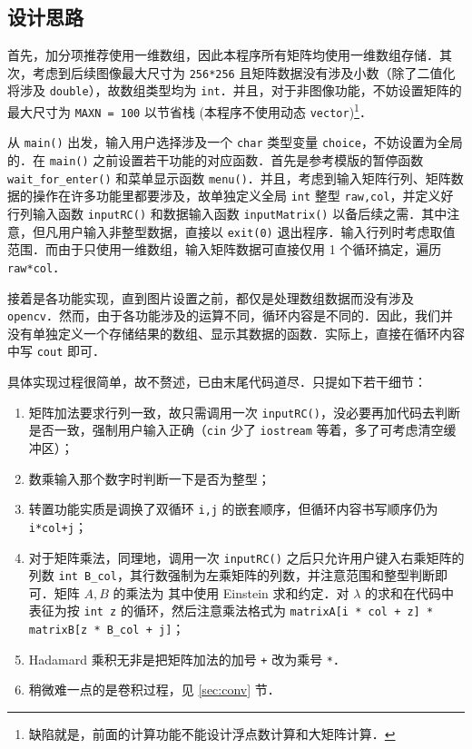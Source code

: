 \documentclass[12pt,a4paper,twoside]{ctexart}
\numberwithin{figure}{section}
\numberwithin{equation}{section}
\begin{document}
\subsection{设计思路}

首先，加分项推荐使用一维数组，因此本程序所有矩阵均使用一维数组存储．其次，考虑到后续图像最大尺寸为 \verb|256*256| 且矩阵数据没有涉及小数（除了二值化将涉及 \verb|double|），故数组类型均为 \verb|int|．并且，对于非图像功能，不妨设置矩阵的最大尺寸为 \verb|MAXN = 100| 以节省栈 (本程序不使用动态 \verb|vector|)\footnote{缺陷就是，前面的计算功能不能设计浮点数计算和大矩阵计算．}．

从 \verb|main()| 出发，输入用户选择涉及一个 \verb|char| 类型变量 \verb|choice|，不妨设置为全局的．在 \verb|main()| 之前设置若干功能的对应函数．首先是参考模版的暂停函数 \verb|wait_for_enter()| 和菜单显示函数 \verb|menu()|．并且，考虑到输入矩阵行列、矩阵数据的操作在许多功能里都要涉及，故单独定义全局 \verb|int| 整型 \verb|raw,col|，并定义好行列输入函数 \verb|inputRC()| 和数据输入函数 \verb|inputMatrix()| 以备后续之需．其中注意，但凡用户输入非整型数据，直接以 \verb|exit(0)| 退出程序．输入行列时考虑取值范围．而由于只使用一维数组，输入矩阵数据可直接仅用 1 个循环搞定，遍历 \verb|raw*col|．

接着是各功能实现，直到图片设置之前，都仅是处理数组数据而没有涉及 \verb|opencv|．然而，由于各功能涉及的运算不同，循环内容是不同的．因此，我们并没有单独定义一个存储结果的数组、显示其数据的函数．实际上，直接在循环内容中写 \verb|cout| 即可．

具体实现过程很简单，故不赘述，已由末尾代码道尽．只提如下若干细节：
\begin{enumerate}
    \item 矩阵加法要求行列一致，故只需调用一次 \verb|inputRC()|，没必要再加代码去判断是否一致，强制用户输入正确（\verb|cin| 少了 \verb|iostream| 等着，多了可考虑清空缓冲区）；
    \item 数乘输入那个数字时判断一下是否为整型；
    \item 转置功能实质是调换了双循环 \verb|i,j| 的嵌套顺序，但循环内容书写顺序仍为 \verb|i*col+j|；
    \item 对于矩阵乘法，同理地，调用一次 \verb|inputRC()| 之后只允许用户键入右乘矩阵的列数 \verb|int B_col|，其行数强制为左乘矩阵的列数，并注意范围和整型判断即可．矩阵 $A,B$ 的乘法为
    其中使用 Einstein 求和约定．对 $\lambda$ 的求和在代码中表征为按 \verb|int z| 的循环，然后注意乘法格式为 \verb|matrixA[i * col + z] * matrixB[z * B_col + j]|；
    \item Hadamard 乘积无非是把矩阵加法的加号 \verb|+| 改为乘号 \verb|*|．
    \item 稍微难一点的是卷积过程，见 \ref{sec:conv} 节．
\end{enumerate}
\end{document}
